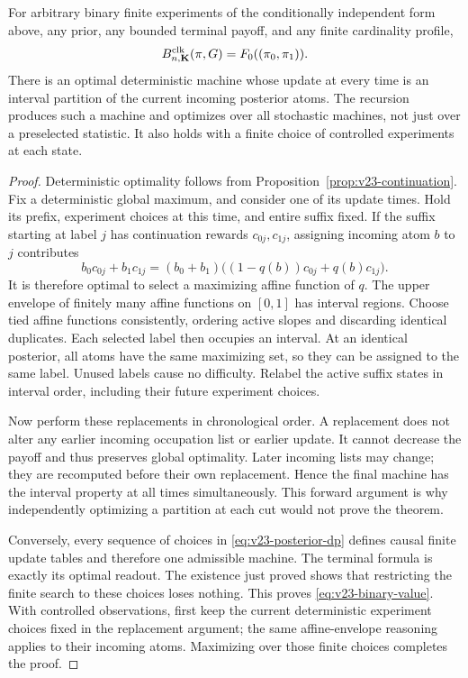 \begin{theorem}
\label{thm:v23-interval}
For arbitrary binary finite experiments of the conditionally independent
form above, any prior, any bounded terminal payoff, and any finite
cardinality profile,
\begin{equation}\label{eq:v23-binary-value}
 B^{\rm clk}_{n,\mathbf K}(\pi,G)
                  =F_0((\pi_0,\pi_1)).
\end{equation}
There is an optimal deterministic machine whose update at every time
is an interval partition of the current incoming posterior atoms.
The recursion produces such a machine and optimizes over all stochastic
machines, not just over a preselected statistic. It also holds with a
finite choice of controlled experiments at each state.
\end{theorem}
\begin{proof}
Deterministic optimality follows from
Proposition~\ref{prop:v23-continuation}. Fix a deterministic global
maximum, and consider one of its update times. Hold its prefix,
experiment choices at this time, and entire suffix fixed. If the suffix
starting at label $j$ has continuation rewards $c_{0j},c_{1j}$, assigning
incoming atom $b$ to $j$ contributes
\[
 b_0c_{0j}+b_1c_{1j}
       =(b_0+b_1)\bigl((1-q(b))c_{0j}+q(b)c_{1j}\bigr).
\]
It is therefore optimal to select a maximizing affine function of $q$.
The upper envelope of finitely many affine functions on $[0,1]$ has
interval regions. Choose tied affine functions consistently, ordering
active slopes and discarding identical duplicates. Each selected label
then occupies an interval. At an identical posterior, all atoms have
the same maximizing set, so they can be assigned to the same label.
Unused labels cause no difficulty. Relabel the active suffix states
in interval order, including their future experiment choices.

Now perform these replacements in chronological order. A replacement
does not alter any earlier incoming occupation list or earlier update.
It cannot decrease the payoff and thus preserves global optimality.
Later incoming lists may change; they are recomputed before their own
replacement. Hence the final machine has the interval property at
all times simultaneously. This forward argument is why independently
optimizing a partition at each cut would not prove the theorem.

Conversely, every sequence of choices in
\eqref{eq:v23-posterior-dp} defines causal finite update tables and
therefore one admissible machine. The terminal formula is exactly its
optimal readout. The existence just proved shows that restricting the
finite search to these choices loses nothing. This proves
\eqref{eq:v23-binary-value}. With controlled observations, first keep the
current deterministic experiment choices fixed in the replacement
argument; the same affine-envelope reasoning applies to their incoming
atoms. Maximizing over those finite choices completes the proof.
\end{proof}

